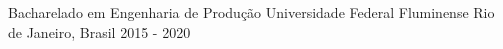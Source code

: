 \begin{cventries}
  \cventry
    {Bacharelado em Engenharia de Produção} %
    {Universidade Federal Fluminense} %
    {Rio de Janeiro, Brasil} %
    {2015 - 2020} %
    {
      \begin{cvitems} %
      \end{cvitems}
    }

\end{cventries} 